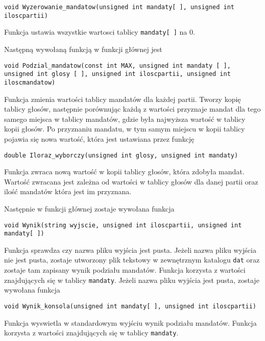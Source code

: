 \documentclass[12pt,a4paper]{article}
\begin{document}
\begin{lstlisting}
void Wyzerowanie_mandatow(unsigned int mandaty[ ], unsigned int iloscpartii)
\end{lstlisting}
Funkcja ustawia wszystkie wartosci tablicy \texttt{mandaty[ ]} na 0.
\newline

Następną wywołaną funkcją w funkcji głównej jest

\begin{lstlisting}
void Podzial_mandatow(const int MAX, unsigned int mandaty [ ], unsigned int glosy [ ], unsigned int iloscpartii, unsigned int iloscmandatow)
\end{lstlisting}
Funkcja zmienia wartości tablicy mandatów dla każdej partii. 
Tworzy kopię tablicy głosów, następnie porównując każdą z wartości przyznaje mandat dla tego samego miejsca w tablicy mandatów, gdzie była najwyższa wartość w tablicy kopii głosów. Po przyznaniu mandatu, w tym samym miejscu w kopii tablicy pojawia się nowa wartość, która jest ustawiana przez funkcję

\begin{lstlisting}
double Iloraz_wyborczy(unsigned int glosy, unsigned int mandaty)
\end{lstlisting}
Funkcja zwraca nową wartość w kopii tablicy głosów, która zdobyła mandat.
Wartość zwracana jest zależna od wartości w tablicy głosów dla danej partii oraz ilość mandatów która jest im przyznana.
\newline

Następnie w funkcji głównej zostaje wywołana funkcja

\begin{lstlisting}
void Wynik(string wyjscie, unsigned int iloscpartii, unsigned int mandaty[ ])
\end{lstlisting}

Funkcja sprawdza czy nazwa pliku wyjścia jest pusta. Jeżeli nazwa pliku wyjścia nie jest pusta, zostaje utworzony plik tekstowy w zewnętrznym katalogu \texttt{dat} oraz zostaje tam zapisany wynik podziału mandatów. Funkcja korzysta z wartości znajdujących się w tablicy \texttt{mandaty}. Jeżeli nazwa pliku wyjścia jest pusta, zostaje wywołana funkcja

\begin{lstlisting}
void Wynik_konsola(unsigned int mandaty[ ], unsigned int iloscpartii)
\end{lstlisting}

Funkcja wyswietla w standardowym wyjściu wynik podziału mandatów. Funkcja korzysta z wartości znajdujących się w tablicy \texttt{mandaty}.
\end{document}
